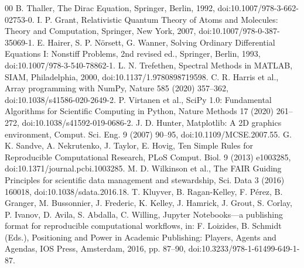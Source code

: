 \documentclass[a4paper,fleqn]{cas-dc}
\begin{document}
\begin{thebibliography}{00}
 B. Thaller, The Dirac Equation, Springer, Berlin, 1992, doi:10.1007/978-3-662-02753-0.
 I. P. Grant, Relativistic Quantum Theory of Atoms and Molecules: Theory and Computation, Springer, New York, 2007, doi:10.1007/978-0-387-35069-1.
 E. Hairer, S. P. N\"orsett, G. Wanner, Solving Ordinary Differential Equations I: Nonstiff Problems, 2nd revised ed., Springer, Berlin, 1993, doi:10.1007/978-3-540-78862-1.
 L. N. Trefethen, Spectral Methods in MATLAB, SIAM, Philadelphia, 2000, doi:10.1137/1.9780898719598.
 C. R. Harris et al., Array programming with NumPy, Nature 585 (2020) 357--362, doi:10.1038/s41586-020-2649-2.
 P. Virtanen et al., SciPy 1.0: Fundamental Algorithms for Scientific Computing in Python, Nature Methods 17 (2020) 261--272, doi:10.1038/s41592-019-0686-2.
 J. D. Hunter, Matplotlib: A 2D graphics environment, Comput. Sci. Eng. 9 (2007) 90--95, doi:10.1109/MCSE.2007.55.
 G. K. Sandve, A. Nekrutenko, J. Taylor, E. Hovig, Ten Simple Rules for Reproducible Computational Research, PLoS Comput. Biol. 9 (2013) e1003285, doi:10.1371/journal.pcbi.1003285.
 M. D. Wilkinson et al., The FAIR Guiding Principles for scientific data management and stewardship, Sci. Data 3 (2016) 160018, doi:10.1038/sdata.2016.18.
 T. Kluyver, B. Ragan-Kelley, F. P\'erez, B. Granger, M. Bussonnier, J. Frederic, K. Kelley, J. Hamrick, J. Grout, S. Corlay, P. Ivanov, D. Avila, S. Abdalla, C. Willing, Jupyter Notebooks---a publishing format for reproducible computational workflows, in: F. Loizides, B. Schmidt (Eds.), Positioning and Power in Academic Publishing: Players, Agents and Agendas, IOS Press, Amsterdam, 2016, pp. 87--90, doi:10.3233/978-1-61499-649-1-87.
\end{thebibliography}
\end{document}
